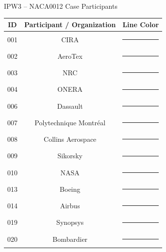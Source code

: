 
\begin{frame}{\small IPW3 -- NACA0012 Case Participants}
\scriptsize


\centering

\renewcommand{\arraystretch}{1.20}
\setlength{\tabcolsep}{8pt}

\begin{tabular}{ccc}
\toprule
\textbf{ID} &
\textbf{Participant / Organization} &
\textbf{Line Color} \\
\midrule

001 & CIRA                   & \textcolor{p001}{\rule{1.5cm}{1.5pt}} \\
002 & AeroTex                & \textcolor{p002}{\rule{1.5cm}{1.5pt}} \\
003 & NRC                    & \textcolor{p003}{\rule{1.5cm}{1.5pt}} \\
004 & ONERA                  & \textcolor{p004}{\rule{1.5cm}{1.5pt}} \\
006 & Dassault               & \textcolor{p006}{\rule{1.5cm}{1.5pt}} \\
007 & Polytechnique Montréal & \textcolor{p007}{\rule{1.5cm}{1.5pt}} \\
008 & Collins Aerospace      & \textcolor{p008}{\rule{1.5cm}{1.5pt}} \\
009 & Sikorsky               & \textcolor{p009}{\rule{1.5cm}{1.5pt}} \\
010 & NASA                   & \textcolor{p010}{\rule{1.5cm}{1.5pt}} \\
013 & Boeing                 & \textcolor{p013}{\rule{1.5cm}{1.5pt}} \\
014 & Airbus                 & \textcolor{p014}{\rule{1.5cm}{1.5pt}} \\
019 & Synopsys               & \textcolor{p019}{\rule{1.5cm}{1.5pt}} \\
020 & Bombardier             & \textcolor{p020}{\rule{1.5cm}{1.5pt}} \\

\bottomrule
\end{tabular}

\end{frame}

